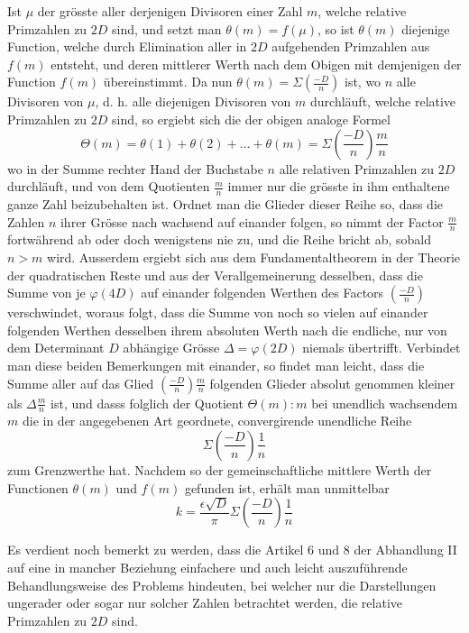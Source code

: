 Ist $\mu$ der grösste aller derjenigen Divisoren einer Zahl $m$, welche relative Primzahlen zu $2D$ sind, und setzt man $\theta(m)=f(\mu)$, so ist $\theta(m)$ diejenige Function, welche durch Elimination aller in $2D$ aufgehenden Primzahlen aus $f(m)$ entsteht, und deren mittlerer Werth nach dem Obigen mit demjenigen der Function $f(m)$ übereinstimmt. Da nun $\theta(m)=\Sigma\left(\frac{-D}n\right)$ ist, wo $n$ alle Divisoren von $\mu$, d. h. alle diejenigen Divisoren von $m$ durchläuft, welche relative Primzahlen zu $2D$ sind, so ergiebt sich die der obigen analoge Formel
\[
\Theta(m)=\theta(1)+\theta(2)+\ldots+\theta(m)=\Sigma\left(\frac{-D}n\right)\frac mn
\]
wo in der Summe rechter Hand der Buchstabe $n$ alle relativen Primzahlen zu $2D$ durchläuft, und von dem Quotienten $\frac mn$ immer nur die grösste in ihm enthaltene ganze Zahl beizubehalten ist. Ordnet man die Glieder dieser Reihe so, dass die Zahlen $n$ ihrer Grösse nach wachsend auf einander folgen, so nimmt der Factor $\frac mn$ fortwährend ab oder doch wenigstens nie zu, und die Reihe bricht ab, sobald $n>m$ wird. Ausserdem ergiebt sich aus dem Fundamentaltheorem in der Theorie der quadratischen Reste und aus der Verallgemeinerung desselben, dass die Summe von je $\varphi(4D)$ auf einander folgenden Werthen des Factors $\left(\frac{-D}n\right)$ verschwindet, woraus folgt, dass die Summe von noch so vielen auf einander folgenden Werthen
desselben ihrem absoluten Werth nach die endliche, nur von dem Determinant $D$ abhängige Grösse $\Delta=\varphi(2D)$ niemals übertrifft. Verbindet man diese beiden Bemerkungen mit einander, so findet man leicht, dass die Summe aller auf das Glied $\left(\frac{-D}n\right)\frac mn$ folgenden Glieder absolut genommen kleiner als $\Delta\frac mn$ ist, und dasss folglich der Quotient $\Theta(m):m$ bei unendlich wachsendem $m$ die in der angegebenen Art geordnete, convergirende unendliche Reihe
\[
\Sigma\left(\frac{-D}n\right)\frac1n
\]
zum Grenzwerthe hat. Nachdem so der gemeinschaftliche mittlere Werth der Functionen $\theta(m)$ und $f(m)$ gefunden ist, erhält man unmittelbar
\[
k=\frac{\epsilon\surd D}\pi\Sigma\left(\frac{-D}n\right)\frac1n
\]

Es verdient noch bemerkt zu werden, dass die Artikel 6 und 8 der Abhandlung II auf eine in mancher Beziehung einfachere und auch leicht auszuführende Behandlungsweise des Problems hindeuten, bei welcher nur die Darstellungen ungerader oder sogar nur solcher Zahlen betrachtet werden, die relative Primzahlen zu $2D$ sind.
\BookRule{35mm}
